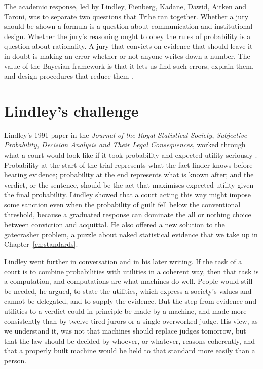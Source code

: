 The academic response, led by Lindley, Fienberg, Kadane, Dawid, Aitken and Taroni, was to separate two questions that Tribe ran together. Whether a jury should be shown a formula is a question about communication and institutional design. Whether the jury's reasoning ought to obey the rules of probability is a question about rationality. A jury that convicts on evidence that should leave it in doubt is making an error whether or not anyone writes down a number. The value of the Bayesian framework is that it lets us find such errors, explain them, and design procedures that reduce them \citep{fienberg_kadane1983,aitken_taroni2004,dawid2002}.

\section{Lindley's challenge}

Lindley's 1991 paper in the \emph{Journal of the Royal Statistical Society}, \emph{Subjective Probability, Decision Analysis and Their Legal Consequences}, worked through what a court would look like if it took probability and expected utility seriously \citep{lindley1991}. Probability at the start of the trial represents what the fact finder knows before hearing evidence; probability at the end represents what is known after; and the verdict, or the sentence, should be the act that maximises expected utility given the final probability. Lindley showed that a court acting this way might impose some sanction even when the probability of guilt fell below the conventional threshold, because a graduated response can dominate the all or nothing choice between conviction and acquittal. He also offered a new solution to the gatecrasher problem, a puzzle about naked statistical evidence that we take up in Chapter~\ref{ch:standards}.

Lindley went further in conversation and in his later writing. If the task of a court is to combine probabilities with utilities in a coherent way, then that task is a computation, and computations are what machines do well. People would still be needed, he argued, to state the utilities, which express a society's values and cannot be delegated, and to supply the evidence. But the step from evidence and utilities to a verdict could in principle be made by a machine, and made more consistently than by twelve tired jurors or a single overworked judge. His view, as we understand it, was not that machines should replace judges tomorrow, but that the law should be decided by whoever, or whatever, reasons coherently, and that a properly built machine would be held to that standard more easily than a person.

